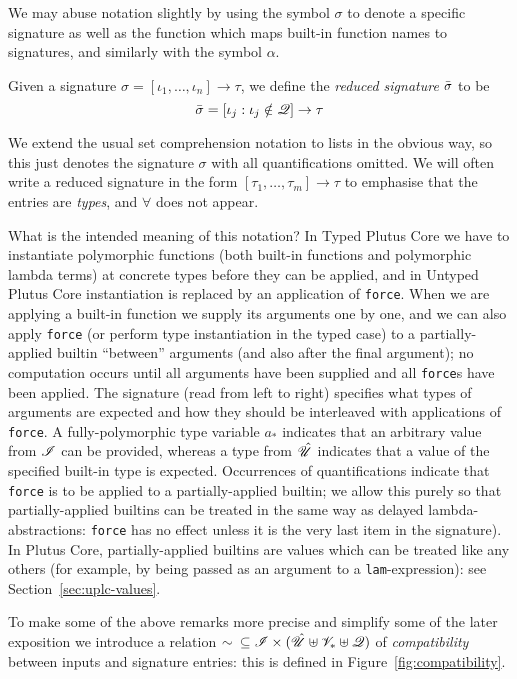 \noindent We may abuse notation slightly by using the symbol $\sigma$ to denote
a specific signature as well as the function which maps built-in function names
to signatures, and similarly with the symbol $\alpha$.

\medskip
\noindent Given a signature
$\sigma = [\iota_1, \ldots, \iota_n] \rightarrow \tau$,
we define the \textit{reduced signature} $\bar{\sigma}$ to be
$$
\bar{\sigma} = [\iota_j : \iota_j \notin \mathscr{Q}] \rightarrow \tau
$$

We extend the usual set comprehension notation to lists in the obvious way, so
this just denotes the signature $\sigma$ with all quantifications omitted. We
will often write a reduced signature in the form $[\tau_1, \ldots, \tau_m]
\rightarrow \tau$ to emphasise that the entries are \textit{types}, and
$\mathbf{\forall}$ does not appear.

What is the intended meaning of this notation?  In Typed Plutus Core we have to
instantiate polymorphic functions (both built-in functions and polymorphic
lambda terms) at concrete types before they can be applied, and in Untyped
Plutus Core instantiation is replaced by an application of \texttt{force}.  When
we are applying a built-in function we supply its arguments one by one, and we
can also apply \texttt{force} (or perform type instantiation in the typed case)
to a partially-applied builtin ``between'' arguments (and also after the final
argument); no computation occurs until all arguments have been supplied and all
\texttt{force}s have been applied. The signature (read from left to right)
specifies what types of arguments are expected and how they should be
interleaved with applications of \texttt{force}. A fully-polymorphic type
variable $a_*$ indicates that an arbitrary value from $\mathscr{I}$ can be provided,
whereas a type from $\hat{\mathscr{U}}$ indicates that a value of the specified built-in
type is expected. Occurrences of quantifications indicate that \texttt{force} is
to be applied to a partially-applied builtin; we allow this purely so that
partially-applied builtins can be treated in the same way as delayed
lambda-abstractions: \texttt{force} has no effect unless it is the very last
item in the signature).  In Plutus Core, partially-applied builtins are values
which can be treated like any others (for example, by being passed as an
argument to a \texttt{lam}-expression): see Section~\ref{sec:uplc-values}.

To make some of the above remarks more precise and simplify some of the later
exposition we introduce a relation $\sim \enspace \subseteq \mathscr{I} \times
(\hat{\mathscr{U}} \uplus \mathscr{V}_* \uplus \mathscr{Q})$ of \textit{compatibility} between inputs and
signature entries: this is defined in Figure~\ref{fig:compatibility}.

